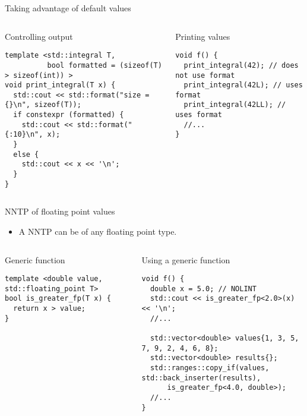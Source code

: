 \begin{frame}[t,fragile]{Taking advantage of default values}

\begin{columns}[T]

\begin{block}{Controlling output}
\begin{lstlisting}
template <std::integral T, 
          bool formatted = (sizeof(T) > sizeof(int)) >
void print_integral(T x) {
  std::cout << std::format("size = {}\n", sizeof(T));
  if constexpr (formatted) {
    std::cout << std::format("{:10}\n", x);
  }
  else {
    std::cout << x << '\n';
  }
}
\end{lstlisting}
\end{block}

\begin{block}{Printing values}
\begin{lstlisting}
void f() {
  print_integral(42); // does not use format
  print_integral(42L); // uses format
  print_integral(42LL); // uses format
  //...
}
\end{lstlisting}
\end{block}

\end{columns}

\end{frame}

\begin{frame}[t,fragile]{NNTP of floating point values}
\begin{itemize}
  \item A NNTP can be of any floating point type.
\end{itemize}

\begin{columns}[T]

\begin{block}{Generic function}
\begin{lstlisting}
template <double value, std::floating_point T>
bool is_greater_fp(T x) {
  return x > value;
}
\end{lstlisting}
\end{block}

\begin{block}{Using a generic function}
\begin{lstlisting}
void f() {
  double x = 5.0; // NOLINT
  std::cout << is_greater_fp<2.0>(x) << '\n';
  //...

  std::vector<double> values{1, 3, 5, 7, 9, 2, 4, 6, 8};
  std::vector<double> results{};
  std::ranges::copy_if(values, std::back_inserter(results), 
      is_greater_fp<4.0, double>);
  //...
}
\end{lstlisting}
\end{block}

\end{columns}
\end{frame}


